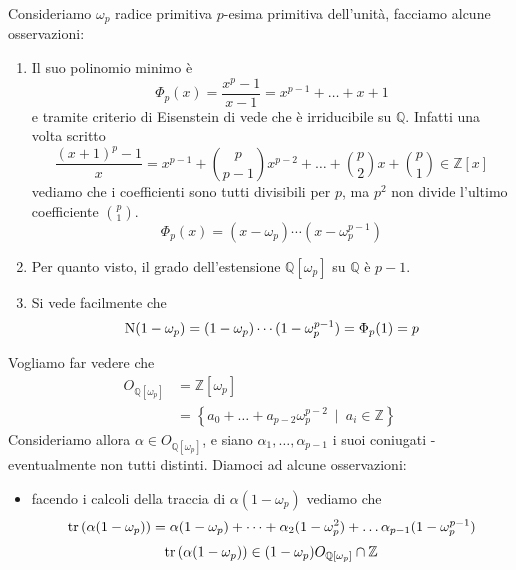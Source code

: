 \begin{esempio}
	Consideriamo $\omega_p$ radice primitiva $p$-esima primitiva dell'unità, facciamo alcune osservazioni:
	\begin{enumerate}
		\item Il suo polinomio minimo è 
		\begin{equation*}
		\Phi_p(x)=\frac{x^p-1}{x-1}=x^{p-1}+\dots+x+1
		\end{equation*}
		e tramite criterio di Eisenstein di vede che è irriducibile su $\mathbb{Q}$. Infatti una volta scritto
		\begin{equation*}
		\frac{(x+1)^p-1}{x}=x^{p-1}+\binom{p}{p-1}x^{p-2}+\dots+\binom{p}{2}x+\binom{p}{1}\in\mathbb{Z}[x]
		\end{equation*}
		vediamo che i coefficienti sono tutti divisibili per $p$, ma $p^2$ non divide l'ultimo coefficiente $\binom{p}{1}$.
		\begin{equation*}
		\Phi_p(x)=(x-\omega_p)\cdots(x-\omega_p^{p-1})
		\end{equation*}
		\item Per quanto visto, il grado dell'estensione $\mathbb{Q}[\omega_p]$ su $\mathbb{Q}$ è $p-1$.
		\item Si vede facilmente che
		\begin{equation*}
		\operatorname{N}(1-\omega_p)=(1-\omega_p)\cdots(1-\omega_p^{p-1})=\Phi_p(1)=p
		\end{equation*}
	\end{enumerate}
	Vogliamo far vedere che 
	\begin{align*}
	O_{\mathbb{Q}[\omega_p]}&=\mathbb{Z}[\omega_p]\\
	&=\left\{a_0+\dots+a_{p-2}\omega_p^{p-2} \ \mid \ a_i\in\mathbb{Z}\right\}
	\end{align*}
	Consideriamo allora $\alpha\in O_{\mathbb{Q}[\omega_p]}$, e siano $\alpha_1,\dots,\alpha_{p-1}$ i suoi coniugati - eventualmente non tutti distinti. Diamoci ad alcune osservazioni:
	\begin{itemize}
		\item facendo i calcoli della traccia di $\alpha(1-\omega_p)$ vediamo che 
		\begin{equation*}
		\operatorname{tr}\left(\alpha(1-\omega_p)\right)=\alpha(1-\omega_p)+\dots+\alpha_2(1-\omega_p^2)+\dots\alpha_{p-1}(1-\omega_p^{p-1})
		\end{equation*}
		\begin{equation*}
		\operatorname{tr}\left(\alpha(1-\omega_p)\right)\in(1-\omega_p)O_{\mathbb{Q}[\omega_p]}\cap\mathbb{Z}
		\end{equation*}

\end{itemize}
\end{esempio}
